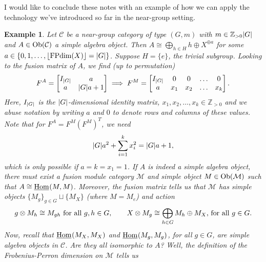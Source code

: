 \documentclass[12pt, reqno]{amsart}
\numberwithin{equation}{section}
\theoremstyle{plainspace}
\theoremstyle{definitionspace}
\newtheorem{example}[theorem]{Example}
\theoremstyle{remarkspace}
\DeclarePairedDelimiter{\abs}{\lvert}{\rvert}
\newcommand{\mathcat}[1]{\mathcal{#1}}
\newcommand{\Ob}{\textup{Ob}}
\newcommand{\IntHom}[2][]{
	\ifthenelse{\equal{#2}{}}
		{\underline{\textup{Hom}}_{#1}}
		{\underline{\textup{Hom}}_{#1}\!\left(#2\right)}
}
\newcommand{\FPdim}{\textup{FPdim}}
\begin{document}
\noindent I would like to conclude these notes with an example of how we can apply the technology we've introduced so far in the near-group setting. 
\newline

\begin{example}\label{ex:near-group_algebras}
Let $\mathcat{C}$ be a near-group category of type $(G, m)$ with $m \in \mathbb{Z}_{>0}\abs{G}$ and $A \in \Ob(\mathcat{C})$ a simple algebra object. Then $A \cong \bigoplus_{h \in H}{h} \oplus X^{\oplus a}$ for some $a \in \{0, 1, \dots, \lfloor\FPdim(X)\rfloor = \abs{G}\}$. Suppose $H = \{e\}$, the trivial subgroup. Looking to the fusion matrix of $A$, we find (up to permutation)
\begin{align*}
\begin{split}
F^A = \begin{bmatrix}
I_{\abs{G}} & a \\
a & \abs{G}a + 1
\end{bmatrix} \implies F^M = \begin{bmatrix}
I_{\abs{G}} & 0 & 0 & \dots & 0 \\
a & x_1 & x_2 & \dots & x_k
\end{bmatrix}.
\end{split}
\end{align*}
Here, $I_{\abs{G}}$ is the $\abs{G}$-dimensional identity matrix, $x_1, x_2, \dots, x_k \in \mathbb{Z}_{>0}$ and we abuse notation by writing $a$ and $0$ to denote rows and columns of these values. Note that for $F^A = F^M (F^M)^T$, we need
\begin{align*}
\begin{split}
\abs{G}a^2 + \sum_{i=1}^{k}{x_i^2} = \abs{G}a + 1,
\end{split}
\end{align*}
which is only possible if $a = k = x_1 = 1$. If $A$ is indeed a simple algebra object, there must exist a fusion module category $\mathcat{M}$ and simple object $M \in \Ob(\mathcat{M})$ such that $A \cong \IntHom{M, M}$. Moreover, the fusion matrix tells us that $\mathcat{M}$ has simple objects $\{M_g\}_{g \in G} \sqcup \{M_X\}$ (where $M = M_e$) and action
\begin{align*}
\begin{split}
\textnormal{$g \otimes M_h \cong M_{gh}$ for all $g, h \in G$}, \quad\quad \textnormal{$X \otimes M_g \cong \bigoplus_{h \in G}{M_h} \oplus M_X$, for all $g \in G$}.
\end{split}
\end{align*}
Now, recall that $\IntHom{M_X, M_X}$ and $\IntHom{M_g, M_g}$, for all $g \in G$, are simple algebra objects in $\mathcat{C}$. Are they all isomorphic to $A$? Well, the definition of the Frobenius-Perron dimension on $\mathcat{M}$ tells us

\end{example}
\end{document}

